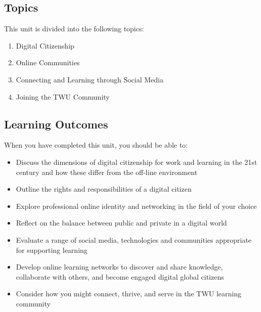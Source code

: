 \documentclass[
]{book}
\providecommand{\tightlist}{%
  \setlength{\itemsep}{0pt}\setlength{\parskip}{0pt}}
\theoremstyle{definition}
\theoremstyle{definition}
\theoremstyle{definition}
\theoremstyle{definition}
\theoremstyle{remark}
\begin{document}
\hypertarget{topics-4}{%
\subsection*{Topics}\label{topics-4}}

This unit is divided into the following topics:

\begin{enumerate}
\def\labelenumi{\arabic{enumi}.}
\tightlist
\item
  Digital Citizenship
\item
  Online Communities
\item
  Connecting and Learning through Social Media
\item
  Joining the TWU Community
\end{enumerate}

\hypertarget{learning-outcomes-4}{%
\subsection*{Learning Outcomes}\label{learning-outcomes-4}}

When you have completed this unit, you should be able to:

\begin{itemize}
\tightlist
\item
  Discuss the dimensions of digital citizenship for work and learning in the 21st century and how these differ from the off-line environment\\
\item
  Outline the rights and responsibilities of a digital citizen\\
\item
  Explore professional online identity and networking in the field of your choice
\item
  Reflect on the balance between public and private in a digital world
\item
  Evaluate a range of social media, technologies and communities appropriate for supporting learning\\
\item
  Develop online learning networks to discover and share knowledge, collaborate with others, and become engaged digital global citizens\\
\item
  Consider how you might connect, thrive, and serve in the TWU learning community
\end{itemize}
\end{document}
